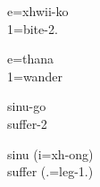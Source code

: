 	\ea 
\label{ex:alignment1}
	\gll e=xhwii-ko\\
	 1=bite-2. \\
	\glt {}
	\z
	
	
	\ea\label{ex:alignment2}
	\gll e=thana\\
	 1=wander\\
	\glt {}
	\z
	
	
	\ea\label{ex:alignment3}
	\gll sinu-go\\
	 suffer-2\\
	\glt {}
	\z
	
	
	\ea\label{ex:WCstat_inan}
	\gll sinu (i=xh-ong)\\
	 suffer (.=leg-1.)\\
	\glt {}
	\z

